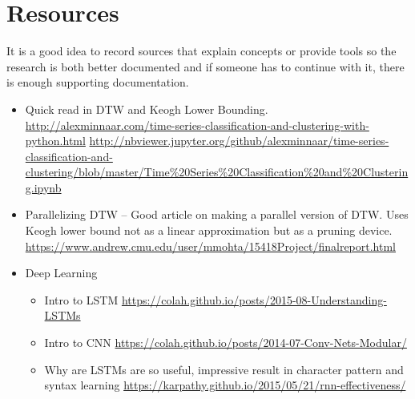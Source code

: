 \documentclass{project-logbook}
\begin{document}
{%





\appendix

\section{Resources}
	\begin{tip}
		It is a good idea to record sources that explain concepts or provide tools so the research is both better documented and if someone has to continue with it, there is enough supporting documentation.
	\end{tip}
	\begin{itemize}
    		\item Quick read in DTW and Keogh Lower Bounding. \newline
			\url{http://alexminnaar.com/time-series-classification-and-clustering-with-python.html} \newline
			\url{http://nbviewer.jupyter.org/github/alexminnaar/time-series-classification-and-clustering/blob/master/Time%20Series%20Classification%20and%20Clustering.ipynb}
    		
		\item Parallelizing DTW -- Good article on making a parallel version of DTW. Uses Keogh lower bound not as a linear approximation but as a pruning device. \newline
			\url{https://www.andrew.cmu.edu/user/mmohta/15418Project/finalreport.html}

    		\item Deep Learning
    			\begin{itemize}
        				\item Intro to LSTM \newline
					\url{https://colah.github.io/posts/2015-08-Understanding-LSTMs}
        				\item Intro to CNN \newline
					 \url{https://colah.github.io/posts/2014-07-Conv-Nets-Modular/}
				 \item Why are LSTMs are so useful, impressive result in character pattern and syntax learning \newline
					\url{https://karpathy.github.io/2015/05/21/rnn-effectiveness/}
    			\end{itemize}
	\end{itemize}


}
\end{document}
